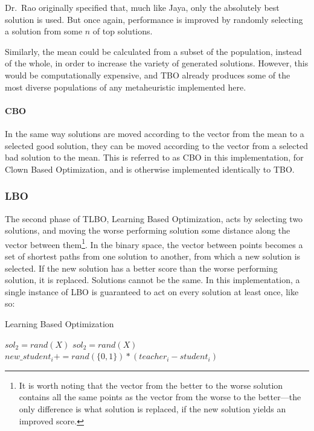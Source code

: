 \documentclass[11pt, letterpaper, onecolumn]{article}
\begin{document}
Dr.~Rao originally specified that, much like Jaya, only the absolutely best solution is used. But once again, performance is improved by randomly selecting a solution from some $n$ of top solutions. 

Similarly, the mean could be calculated from a subset of the population, instead of the whole, in order to increase the variety of generated solutions. However, this would be computationally expensive, and TBO already produces some of the most diverse populations of any metaheuristic implemented here. 

\paragraph{CBO}

In the same way solutions are moved according to the vector from the mean to a selected good solution, they can be moved according to the vector from a selected bad solution to the mean. This is referred to as CBO in this implementation, for Clown Based Optimization, and is otherwise implemented identically to TBO. 

\subsubsection{LBO}

The second phase of TLBO, Learning Based Optimization, acts by selecting two solutions, and moving the worse performing solution some distance along the vector between them\footnote{It is worth noting that the vector from the better to the worse solution contains all the same points as the vector from the worse to the better---the only difference is what solution is replaced, if the new solution yields an improved score.}. In the binary space, the vector between points becomes a set of shortest paths from one solution to another, from which a new solution is selected.  If the new solution has a better score than the worse performing solution, it is replaced. Solutions cannot be the same. In this implementation, a single instance of LBO is guaranteed to act on every solution at least once, like so:

\begin{algorithm}
\caption{Learning Based Optimization}
\begin{algorithmic}
\STATE $sol_2 = rand(X)$
\STATE $sol_2 = rand(X)$
\ENDWHILE
{}
\STATE $new\_student_i \mathrel{{+}{=}} rand(\{0,1\}) * (teacher_i - student_i)$
\ENDFOR
{}
\ENDIF
\ENDFOR
\end{algorithmic}
\end{algorithm}
\end{document}
